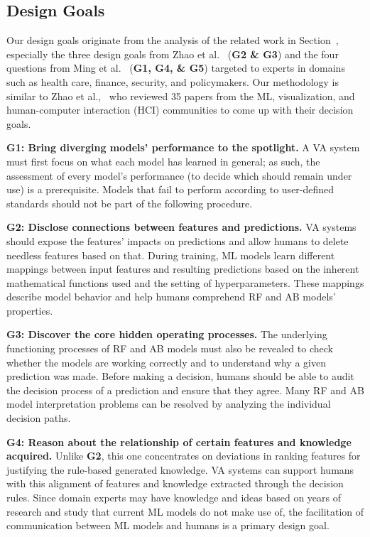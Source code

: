 \subsection{Design Goals}

Our design goals originate from the analysis of the related work in Section~, especially the three design goals from Zhao et al.~\cite{Zhao2019iForest} (\textbf{G2 \& G3}) and the four questions from Ming et al.~\cite{Ming2019RuleMatrix} (\textbf{G1, G4, \& G5}) targeted to experts in domains such as health care, finance, security, and policymakers. 
Our methodology is similar to Zhao et al.,~\cite{Zhao2019iForest} who reviewed 35 papers from the ML, visualization, and human-computer interaction (HCI) communities to come up with their decision goals.

\textbf{G1: Bring diverging models' performance to the spotlight.}
A VA system must first focus on what each model has learned in general; as such, the assessment of every model's performance (to decide which should remain under use) is a prerequisite. Models that fail to perform according to user-defined standards should not be part of the following procedure.

\textbf{G2: Disclose connections between features and predictions.}
VA systems should expose the features' impacts on predictions and allow humans to delete needless features based on that. During training, ML models learn different mappings between input features and resulting predictions based on the inherent mathematical functions used and the setting of hyperparameters. These mappings describe model behavior and help humans comprehend RF and AB models' properties.

\textbf{G3: Discover the core hidden operating processes.}
The underlying functioning processes of RF and AB models must also be revealed to check whether the models are working correctly and to understand why a given prediction was made. Before making a decision, humans should be able to audit the decision process of a prediction and ensure that they agree. Many RF and AB model interpretation problems can be resolved by analyzing the individual decision paths.

\textbf{G4: Reason about the relationship of certain features and knowledge acquired.}
Unlike \textbf{G2}, this one concentrates on deviations in ranking features for justifying the rule-based generated knowledge. VA systems can support humans with this alignment of features and knowledge extracted through the decision rules. Since domain experts may have knowledge and ideas based on years of research and study that current ML models do not make use of, the facilitation of communication between ML models and humans is a primary design goal.

